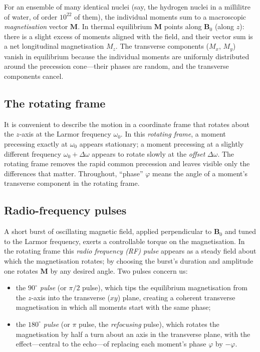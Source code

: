 \documentclass[11pt,a4paper]{article}
\theoremstyle{thmstyle}
\theoremstyle{definition}
\theoremstyle{remark}
\newcommand{\Larmor}{\omega_{0}}
\begin{document}
For an ensemble of many identical nuclei (say, the hydrogen nuclei in a
millilitre of water, of order $10^{22}$ of them), the individual moments
sum to a macroscopic \emph{magnetisation} vector $\bm{M}$. In thermal
equilibrium $\bm{M}$ points along $\bm{B}_0$ (along $z$): there is a
slight excess of moments aligned with the field, and their vector sum is
a net longitudinal magnetisation $M_{z}$. The transverse components
($M_{x}$, $M_{y}$) vanish in equilibrium because the individual moments
are uniformly distributed around the precession cone---their phases are
random, and the transverse components cancel.

\subsection{The rotating frame}
\label{sec:rotating-frame}

It is convenient to describe the motion in a coordinate frame that
rotates about the $z$-axis at the Larmor frequency $\Larmor$. In this
\emph{rotating frame}, a moment precessing exactly at $\Larmor$ appears
stationary; a moment precessing at a slightly different frequency
$\Larmor+\Delta\omega$ appears to rotate slowly at the \emph{offset}
$\Delta\omega$. The rotating frame removes the rapid common precession and
leaves visible only the differences that matter. Throughout, ``phase''
$\varphi$ means the angle of a moment's transverse component in the
rotating frame.

\subsection{Radio-frequency pulses}
\label{sec:rf-pulses}

A short burst of oscillating magnetic field, applied perpendicular to
$\bm{B}_0$ and tuned to the Larmor frequency, exerts a controllable
torque on the magnetisation. In the rotating frame this \emph{radio
frequency (RF) pulse} appears as a steady field about which the
magnetisation rotates; by choosing the burst's duration and amplitude one
rotates $\bm{M}$ by any desired angle. Two pulses concern us:

\begin{itemize}[leftmargin=1.4em,itemsep=0.2em]
\item the \emph{$90^{\circ}$ pulse} (or $\pi/2$ pulse), which tips the
equilibrium magnetisation from the $z$-axis into the transverse
($xy$) plane, creating a coherent transverse magnetisation in which all
moments start with the same phase;
\item the \emph{$180^{\circ}$ pulse} (or $\pi$ pulse, the
\emph{refocusing} pulse), which rotates the magnetisation by half a turn
about an axis in the transverse plane, with the effect---central to the
echo---of replacing each moment's phase $\varphi$ by $-\varphi$.
\end{itemize}
\end{document}
